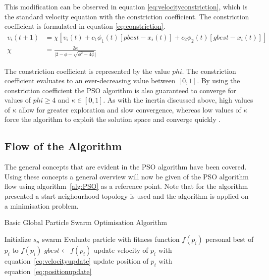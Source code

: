 This modification can be observed in equation \ref{eq:velocityconstriction}, which is the standard velocity equation with the constriction coefficient. The constriction coefficient is formulated in equation \ref{eq:constriction}\cite{adaptPSO,FundamentalSwarm,CompuIntelligenceIntro}.
\begin{align}
v_i(t+1) &= \chi[v_i(t) + c_1\phi_{1}(t)[pbest - x_i(t)] + c_2\phi_{2}(t)[gbest - x_i(t)]]\label{eq:velocityconstriction}\\
\chi &= \frac{2\kappa}{\lvert 2 - \phi - \sqrt{\phi^2 - 4\phi}\rvert}\label{eq:constriction}
\end{align}

The constriction coefficient is represented by the value $phi$. The constriction coefficient evaluates to an ever-decreasing value between $[0,1]$. By using the constriction coefficient the \gls{PSO} algorithm is also guaranteed to converge for values of $phi \geq 4$ and $\kappa \in [0,1]$. As with the inertia discussed above, high values of $\kappa$ allow for greater exploration and slow convergence, whereas low values of $\kappa$ force the algorithm to exploit the solution space and converge quickly \cite{adaptPSO,FundamentalSwarm,CompuIntelligenceIntro}.

\subsection{Flow of the Algorithm}
The general concepts that are evident in the \gls{PSO} algorithm have been covered. Using these concepts a general overview will now be given of the \gls{PSO} algorithm flow using algorithm~\ref{alg:PSO} as a reference point. Note that for the algorithm presented a start neighourhood topology is used and the algorithm is applied on a minimisation problem.
\begin{algorithm}[H]
\caption{Basic Global Particle Swarm Optimisation Algorithm\cite{CompuIntelligenceIntro}}
\label{alg:PSO}
	\begin{algorithmic}[1]
		\State Initialize $s_n$ swarm
				\State Evaluate particle with fitness function $f(p_i)$
					\State personal best of $p_i$ to $f(p_i)$
				\EndIf
					\State $gbest \leftarrow f(p_i)$
				\EndIf
			\EndFor
				\State update velocity of $p_i$ with equation~\ref{eq:velocityupdate}
				\State update position of $p_i$ with equation~\ref{eq:positionupdate}
			\EndFor
		\EndWhile
	\end{algorithmic}
\end{algorithm}

